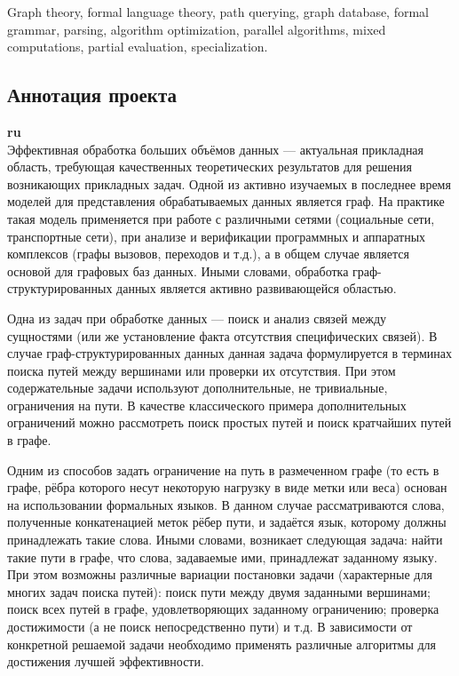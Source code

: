 \documentclass[12pt]{article}  %
\theoremstyle{remark}
\begin{document}
Graph theory, formal language theory, path querying, graph database, formal grammar, parsing, algorithm optimization, parallel algorithms, mixed computations, partial evaluation, specialization.



\subsection{Аннотация проекта}
\textbf{ru}\\
%
Эффективная обработка больших объёмов данных --- актуальная прикладная область, требующая качественных теоретических результатов для решения возникающих прикладных задач.
Одной из активно изучаемых в последнее время моделей для представления обрабатываемых данных является граф.
На практике такая модель применяется при работе с различными сетями (социальные сети, транспортные сети), при анализе и верификации программных и аппаратных комплексов (графы вызовов, переходов и т.д.), а в общем случае является основой для графовых баз данных.
Иными словами, обработка граф-структурированных данных является активно развивающейся областью.

Одна из задач при обработке данных --- поиск и анализ связей между сущностями (или же установление факта отсутствия специфических связей).
В случае граф-структурированных данных данная задача формулируется в терминах поиска путей между вершинами или проверки их отсутствия.
При этом содержательные задачи используют дополнительные, не тривиальные, ограничения на пути.
В качестве классического примера дополнительных ограничений можно рассмотреть поиск простых путей и поиск кратчайших путей в графе.

Одним из способов задать ограничение на путь в размеченном графе (то есть в графе, рёбра которого несут некоторую нагрузку в виде метки или веса) основан на использовании формальных языков.
В данном случае рассматриваются слова, полученные конкатенацией меток рёбер пути, и задаётся язык, которому должны принадлежать такие слова.
Иными словами, возникает следующая задача: найти такие пути в графе, что слова, задаваемые ими, принадлежат заданному языку.
При этом возможны различные вариации постановки задачи (характерные для многих задач поиска путей): поиск пути между двумя заданными вершинами; поиск всех путей в графе, удовлетворяющих заданному ограничению; проверка достижимости (а не поиск непосредственно пути) и т.д.
В зависимости от конкретной решаемой задачи необходимо применять различные алгоритмы для достижения лучшей эффективности.
\end{document}
